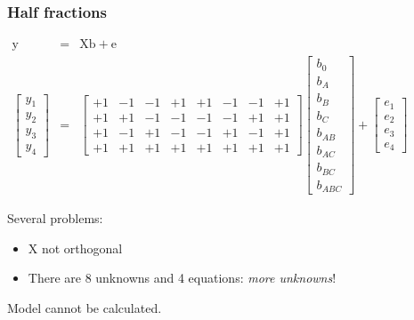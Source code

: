 \begin{frame}\frametitle{Half fractions}

	\begin{exampleblock}{}
		{\color{myOrange}{Use the least squares model to determine what we lose by only doing 4 runs, instead of the full 8.}}
	\end{exampleblock}
	$
	\begin{array}{rcl}
		\mathrm{y} &=& \mathrm{X} \mathrm{b} + \mathrm{e}\\
		\begin{bmatrix}
			y_1\\
			y_2\\
			y_3 \\
			y_4
		\end{bmatrix}
		&=&
		\begin{bmatrix}
			+1 & -1 & -1 & +1 & +1 & -1 & -1 & +1\\
			+1 & +1 & -1 & -1 & -1 & -1 & +1 & +1\\
			+1 & -1 & +1 & -1 & -1 & +1 & -1 & +1\\
			+1 & +1 & +1 & +1 & +1 & +1 & +1 & +1
		\end{bmatrix}
		\begin{bmatrix}
			b_0 \\
			b_A \\
			b_B \\
			b_{C} \\
			b_{AB} \\
			b_{AC} \\
			b_{BC} \\
			b_{ABC}
		\end{bmatrix}
		+
		\begin{bmatrix}
			e_1\\
			e_2\\
			e_3 \\
			e_4
		\end{bmatrix}
	\end{array}
	$

	Several problems:
	\begin{itemize}
		\item	$\mathrm{X}$ not orthogonal
		\item	There are 8 unknowns and 4 equations: \emph{more unknowns}!
	\end{itemize}
	Model cannot be calculated.
\end{frame}

